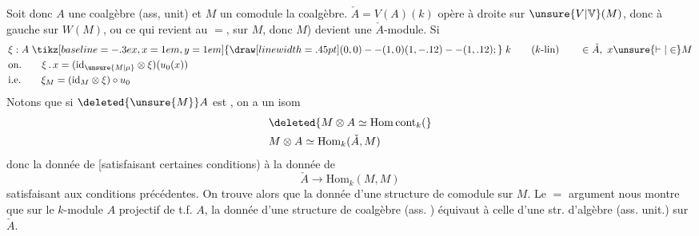 Soit donc $A$ une coalgèbre (ass, unit) et $M$ un comodule  la coalgèbre. $\check A=V(A)(k)$ opère à droite sur $\unsure{V|\mathbb V}(M)$, donc à gauche sur $W(M)$, ou ce qui revient au $=$, sur $M$, donc $M$) devient une $\check A$-module. Si
\[
\begin{aligned}
 &\xi:A\mathrel{\tikz[baseline=-.3ex,x=1em,y=1em]{\draw[line width=.45pt] (0,0)--(1,0) (1,-.12)--(1,.12);}}k\qquad(k\text{-}\mathrm{lin})\qquad\in\check A,\ x\unsure{\vdash|\in}M\\
 &\text{on.}\qquad \xi\,.\,x=(\mathrm{id}_{\unsure{M|\mu}}\otimes\xi)(u_0(x))\\
 &\text{i.e.}\qquad \xi_M=(\mathrm{id}_M\otimes\xi)\circ u_0
\end{aligned}
\]
Notons que si $\deleted{\unsure{M}}A$ est , on a un isom
\[
\begin{aligned}
 &\deleted{M\otimes A\simeq\mathrm{Hom}\,\mathrm{cont}_k(}\\
 &M\otimes A\simeq\mathrm{Hom}_k(\check A,M)
\end{aligned}
\]
donc la donnée de
[satisfaisant certaines conditions)  à la donnée de
\[
 \check A\longrightarrow\mathrm{Hom}_k(M,M)
\]
satisfaisant aux conditions précédentes. On trouve alors que la donnée d'une structure de comodule  sur $M$. Le $=$ argument nous montre que sur le $k$-module $A$ projectif de t.f. $A$, la donnée d'une structure de coalgèbre (ass. ) équivaut à celle d'une str. d'algèbre (ass. unit.) sur $\check A$.

